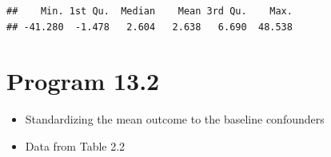 \documentclass[
  10pt,
]{book}
\providecommand{\tightlist}{%
  \setlength{\itemsep}{0pt}\setlength{\parskip}{0pt}}
\begin{document}
\begin{verbatim}
##    Min. 1st Qu.  Median    Mean 3rd Qu.    Max. 
## -41.280  -1.478   2.604   2.638   6.690  48.538
\end{verbatim}

\hypertarget{program-13.2}{%
\section{Program 13.2}\label{program-13.2}}

\begin{itemize}
\tightlist
\item
  Standardizing the mean outcome to the baseline confounders
\item
  Data from Table 2.2
\end{itemize}
\end{document}
